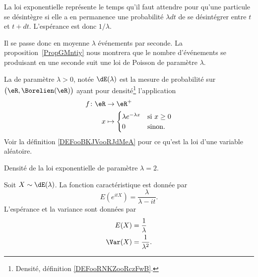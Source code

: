 La loi exponentielle représente le temps qu'il faut attendre pour qu'une particule se désintègre si elle a en permanence une probabilité \( \lambda dt\) de se désintégrer entre \( t\) et \( t+dt\). L'espérance est donc \( 1/\lambda\).

Il se passe donc en moyenne \( \lambda\) événements par seconde. La proposition~\ref{PropGMntiy} nous montrera que le nombre d'événements se produisant en une seconde suit une loi de Poisson de paramètre \( \lambda\).

\begin{definition}       \label{DEFooTSFNooULWNHY}
	La  de paramètre \( \lambda>0\), notée \( \dE(\lambda)\) est la mesure de probabilité sur \( \big( \eR,\Borelien(\eR) \big)   \) ayant pour densité\footnote{Densité, définition \ref{DEFooRNKZooRczFwB}.} l'application
	\begin{equation}
		\begin{aligned}
			f\colon \eR & \to \eR^+ \\
			x           & \mapsto
			\begin{cases}
				\lambda e^{-\lambda x} & \text{si } x\geq 0 \\
				0                      & \text{sinon}.
			\end{cases}
		\end{aligned}
	\end{equation}
	Voir la définition \ref{DEFooBKJVooRJdMeA} pour ce qu'est la loi d'une variable aléatoire.
\end{definition}

Densité de la loi exponentielle de paramètre \( \lambda=2\).

\begin{center}
	
\end{center}

\begin{proposition} \label{PropTxGcWn}
	Soit \( X\sim\dE(\lambda)\). La fonction caractéristique est donnée par
	\begin{equation}		\label{EQooMDJFooKhZkJo}
		E( e^{itX})=\frac{ \lambda }{ \lambda-it }.
	\end{equation}
	L'espérance et la variance sont données par
	\begin{equation}
		\begin{aligned}[]
			E(X)    & =\frac{1}{ \lambda }    \\
			\Var(X) & =\frac{1}{ \lambda^2 }.
		\end{aligned}
	\end{equation}
\end{proposition}

